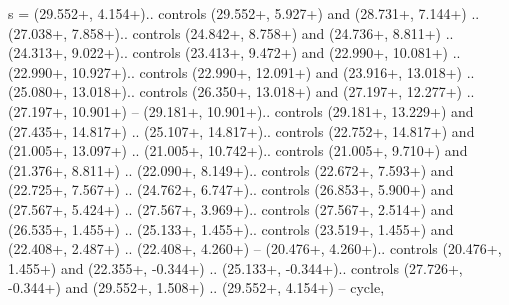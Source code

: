 {s} = {(29.552+\ctpXshift, 4.154+\ctpYshift).. controls (29.552+\ctpXshift, 5.927+\ctpYshift) and (28.731+\ctpXshift, 7.144+\ctpYshift) .. (27.038+\ctpXshift, 7.858+\ctpYshift).. controls (24.842+\ctpXshift, 8.758+\ctpYshift) and (24.736+\ctpXshift, 8.811+\ctpYshift) .. (24.313+\ctpXshift, 9.022+\ctpYshift).. controls (23.413+\ctpXshift, 9.472+\ctpYshift) and (22.990+\ctpXshift, 10.081+\ctpYshift) .. (22.990+\ctpXshift, 10.927+\ctpYshift).. controls (22.990+\ctpXshift, 12.091+\ctpYshift) and (23.916+\ctpXshift, 13.018+\ctpYshift) .. (25.080+\ctpXshift, 13.018+\ctpYshift).. controls (26.350+\ctpXshift, 13.018+\ctpYshift) and (27.197+\ctpXshift, 12.277+\ctpYshift) .. (27.197+\ctpXshift, 10.901+\ctpYshift) -- (29.181+\ctpXshift, 10.901+\ctpYshift).. controls (29.181+\ctpXshift, 13.229+\ctpYshift) and (27.435+\ctpXshift, 14.817+\ctpYshift) .. (25.107+\ctpXshift, 14.817+\ctpYshift).. controls (22.752+\ctpXshift, 14.817+\ctpYshift) and (21.005+\ctpXshift, 13.097+\ctpYshift) .. (21.005+\ctpXshift, 10.742+\ctpYshift).. controls (21.005+\ctpXshift, 9.710+\ctpYshift) and (21.376+\ctpXshift, 8.811+\ctpYshift) .. (22.090+\ctpXshift, 8.149+\ctpYshift).. controls (22.672+\ctpXshift, 7.593+\ctpYshift) and (22.725+\ctpXshift, 7.567+\ctpYshift) .. (24.762+\ctpXshift, 6.747+\ctpYshift).. controls (26.853+\ctpXshift, 5.900+\ctpYshift) and (27.567+\ctpXshift, 5.424+\ctpYshift) .. (27.567+\ctpXshift, 3.969+\ctpYshift).. controls (27.567+\ctpXshift, 2.514+\ctpYshift) and (26.535+\ctpXshift, 1.455+\ctpYshift) .. (25.133+\ctpXshift, 1.455+\ctpYshift).. controls (23.519+\ctpXshift, 1.455+\ctpYshift) and (22.408+\ctpXshift, 2.487+\ctpYshift) .. (22.408+\ctpXshift, 4.260+\ctpYshift) -- (20.476+\ctpXshift, 4.260+\ctpYshift).. controls (20.476+\ctpXshift, 1.455+\ctpYshift) and (22.355+\ctpXshift, -0.344+\ctpYshift) .. (25.133+\ctpXshift, -0.344+\ctpYshift).. controls (27.726+\ctpXshift, -0.344+\ctpYshift) and (29.552+\ctpXshift, 1.508+\ctpYshift) .. (29.552+\ctpXshift, 4.154+\ctpYshift) -- cycle},
